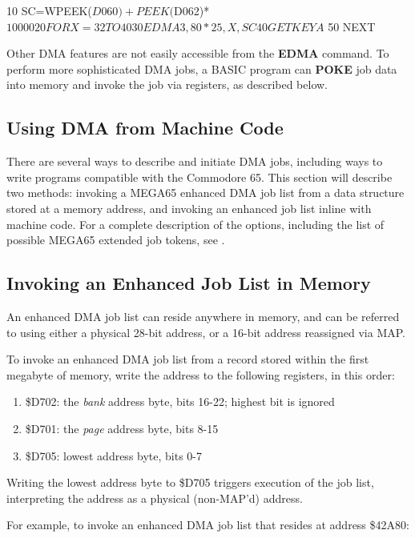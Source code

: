 \begin{basiccode}
10 SC=WPEEK($D060)+PEEK($D062)*$10000
20 FOR X=32 TO 40
30 EDMA 3,80*25,X,SC
40 GETKEY A$
50 NEXT
\end{basiccode}

Other DMA features are not easily accessible from the \textbf{EDMA} command. To perform more sophisticated DMA jobs, a BASIC program can \textbf{POKE} job data into memory and invoke the job via registers, as described below.

\subsection{Using DMA from Machine Code}

There are several ways to describe and initiate DMA jobs, including ways to write programs compatible with the Commodore 65. This section will describe two methods: invoking a MEGA65 enhanced DMA job list from a data structure stored at a memory address, and invoking an enhanced job list inline with machine code. For a complete description of the options, including the list of possible MEGA65 extended job tokens, see .

\subsection{Invoking an Enhanced Job List in Memory}

An enhanced DMA job list can reside anywhere in memory, and can be referred to using either a physical 28-bit address, or a 16-bit address reassigned via MAP.

To invoke an enhanced DMA job list from a record stored within the first megabyte of memory, write the address to the following registers, in this order:

\begin{enumerate}
\item \$D702: the \emph{bank} address byte, bits 16-22; highest bit is ignored
\item \$D701: the \emph{page} address byte, bits 8-15
\item \$D705: lowest address byte, bits 0-7
\end{enumerate}

Writing the lowest address byte to \$D705 triggers execution of the job list, interpreting the address as a physical (non-MAP'd) address.

For example, to invoke an enhanced DMA job list that resides at address \$42A80:

